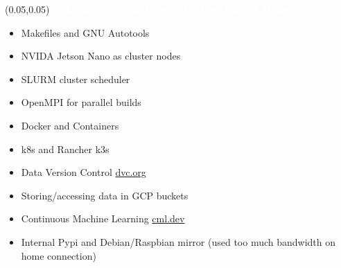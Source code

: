 \documentclass[aspectratio=169]{beamer} %
\begin{document}
\begin{frame}{}
    \setlength{\TPHorizModule}{\textwidth}
    \setlength{\TPVertModule}{\textwidth}
    \begin{textblock}{0.74}(0.05,0.05)
        \bfseries\large\textcolor{white}{Yak Shaving, Side Quests, Endless Rabbit Holes}
    \end{textblock}
    \begin{itemize}
        \item Makefiles and GNU Autotools
        \item NVIDA Jetson Nano as cluster nodes
        \item SLURM cluster scheduler
        \item OpenMPI for parallel builds
        \item Docker and Containers
        \item k8s and Rancher k3s
        \item Data Version Control \href{https://dvc.org}{dvc.org}
        \item Storing/accessing data in GCP buckets
        \item Continuous Machine Learning \href{https://cml.dev/}{cml.dev}
        \item Internal Pypi and Debian/Raspbian mirror (used too much bandwidth on home connection)
    \end{itemize}
\end{frame}

\end{document}
